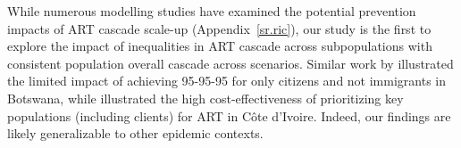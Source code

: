 While numerous modelling studies have examined
the potential prevention impacts of ART cascade scale-up
\cite{Knight2022sr} (Appendix~\ref{sr.ric}),
our study is the first to explore the impact of
inequalities in ART cascade across subpopulations
with consistent population overall cascade across scenarios.
Similar work by \citet{Marukutira2020} illustrated the limited impact of
achieving 95-95-95 for only citizens and not immigrants in Botswana,
while \citet{Maheu-Giroux2019cost} illustrated the high cost-effectiveness of
prioritizing key populations (including clients) for ART in C\^{o}te d’Ivoire.
Indeed, our findings are likely generalizable to other epidemic contexts.
